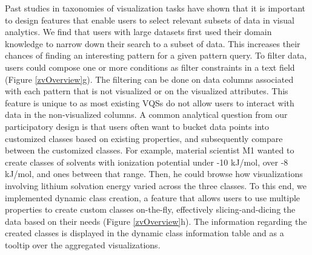 Past studies in taxonomies of visualization tasks have shown that it is important to design features that enable users to select relevant subsets of data in visual analytics\cite{Amar2005,Heer2012}. We find that users with large datasets first used their domain knowledge to narrow down their search to a subset of data. This increases their chances of finding an interesting pattern for a given pattern query. To filter data, users could compose one or more conditions as filter constraints in a text field (Figure \ref{zvOverview}g). The filtering can be done on data columns associated with each pattern that is not visualized or on the visualized attributes. This feature is unique to \zv as most existing VQSs do not allow users to interact with data in the non-visualized columns.
A common analytical question from our participatory design is that users often want to bucket data points into customized classes based on existing properties, and subsequently compare between the customized classes. For example, material scientist M1 wanted to create classes of solvents with ionization potential under -10 kJ/mol, over -8 kJ/mol, and ones between that range. Then, he could browse how visualizations involving lithium solvation energy varied across the three classes. To this end, we implemented dynamic class creation, a feature that allows users to use multiple properties to create custom classes on-the-fly, effectively slicing-and-dicing the data based on their needs (Figure \ref{zvOverview}h). The information regarding the created classes is displayed in the dynamic class information table and as a tooltip over the aggregated visualizations.
